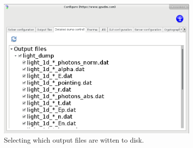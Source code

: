 \documentclass[11pt]{article}
\begin{document}
\begin{figure}
\centering
\includegraphics[width=100mm]{./images/output_files.png}
\caption{Selecting which output files are witten to disk.}
\end{figure}


\end{document}
